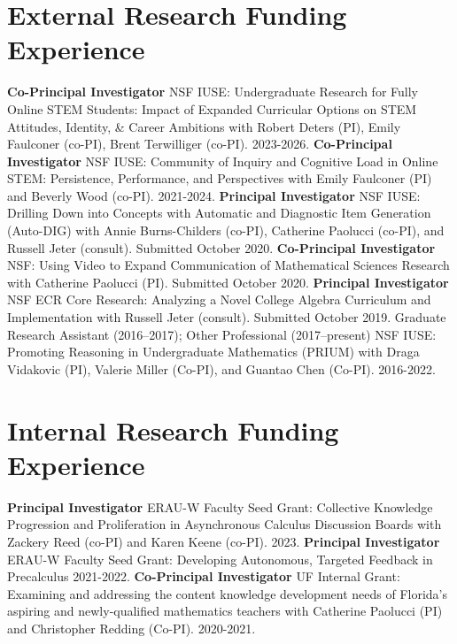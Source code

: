 \documentclass[10pt,a4paper,sans]{moderncv}
\begin{document}
\section{External Research Funding Experience}
	{\textbf{Co-Principal Investigator}}
	{NSF IUSE: Undergraduate Research for Fully Online STEM Students: Impact of Expanded Curricular Options on STEM Attitudes, Identity, \& Career Ambitions}
	{with Robert Deters (PI), Emily Faulconer (co-PI), Brent Terwilliger (co-PI). 2023-2026.}
	{}{}
	{\textbf{Co-Principal Investigator}}
	{NSF IUSE: Community of Inquiry and Cognitive Load in Online STEM: Persistence, Performance, and Perspectives}
	{with Emily Faulconer (PI) and Beverly Wood (co-PI). 2021-2024.}
	{}{}
	{\textbf{Principal Investigator}}
	{NSF IUSE: Drilling Down into Concepts with Automatic and Diagnostic Item Generation (Auto-DIG)}
	{with Annie Burns-Childers (co-PI), Catherine Paolucci (co-PI), and Russell Jeter (consult). Submitted October 2020.}
	{}{}
	{\textbf{Co-Principal Investigator}}
	{NSF: Using Video to Expand Communication of Mathematical Sciences Research}
	{with Catherine Paolucci (PI). Submitted October 2020.}
	{}{}
	{\textbf{Principal Investigator}}
	{NSF ECR Core Research: Analyzing a Novel College Algebra Curriculum and Implementation}
	{with Russell Jeter (consult). Submitted October 2019.}
	{}{}
	{Graduate Research Assistant (2016--2017); Other Professional (2017--present)}
	{NSF IUSE: Promoting Reasoning in Undergraduate Mathematics (PRIUM)}
	{with Draga Vidakovic (PI), Valerie Miller (Co-PI), and Guantao Chen (Co-PI). 2016-2022.}
	{}{}
\section{Internal Research Funding Experience}
	{\textbf{Principal Investigator}}
	{ERAU-W Faculty Seed Grant: Collective Knowledge Progression and Proliferation in Asynchronous Calculus Discussion Boards}
	{with Zackery Reed (co-PI) and Karen Keene (co-PI). 2023.}
	{}{}
	{\textbf{Principal Investigator}}
	{ERAU-W Faculty Seed Grant: Developing Autonomous, Targeted Feedback in Precalculus}
	{2021-2022.}
	{}{}
	{\textbf{Co-Principal Investigator}}
	{UF Internal Grant: Examining and addressing the content knowledge development needs of Florida's aspiring and newly-qualified mathematics teachers}
	{with Catherine Paolucci (PI) and Christopher Redding (Co-PI). 2020-2021.}
	{}{}
\pagebreak
\end{document}
